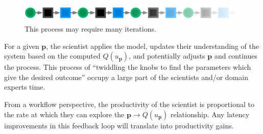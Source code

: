 \documentclass[a4paper,fontsize=12pt]{scrartcl}
\begin{document}
\begin{figure}
  \centering
  \includegraphics[width=\textwidth]{figures/unrolled-fb-loop.pdf}
  \caption{This process may require many iterations.}
  \label{fig:unrolled-fb-loop}
\end{figure}

For a given $\mathbf{p}$, the
scientist applies the model, updates their understanding of the system
based on the computed $Q(u_{\mathbf{p}})$, and potentially adjusts
$\mathbf{p}$ and continues the process. This process of ``twiddling
the knobs to find the parameters which give the desired outcome''
occupy a large part of the scientists and/or domain experts time.

From a workflow perspective, the productivity of the scientist is
proportional to the rate at which they can explore the
$\mathbf{p} \rightarrow Q(u_{\mathbf{p}})$ relationship. Any latency
improvements in this feedback loop will translate into
productivity gains.
\end{document}
